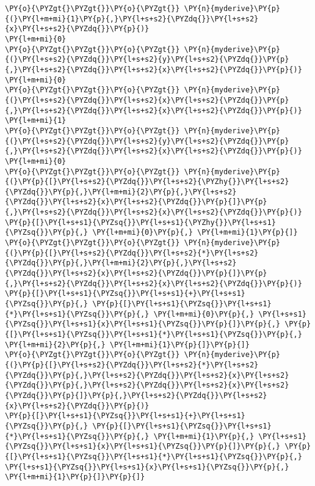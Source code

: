 \begin{Verbatim}[commandchars=\\\{\}]
\PY{o}{\PYZgt{}\PYZgt{}}\PY{o}{\PYZgt{}} \PY{n}{myderive}\PY{p}{(}\PY{l+m+mi}{1}\PY{p}{,}\PY{l+s+s2}{\PYZdq{}}\PY{l+s+s2}{x}\PY{l+s+s2}{\PYZdq{}}\PY{p}{)}
\PY{l+m+mi}{0}
\PY{o}{\PYZgt{}\PYZgt{}}\PY{o}{\PYZgt{}} \PY{n}{myderive}\PY{p}{(}\PY{l+s+s2}{\PYZdq{}}\PY{l+s+s2}{y}\PY{l+s+s2}{\PYZdq{}}\PY{p}{,}\PY{l+s+s2}{\PYZdq{}}\PY{l+s+s2}{x}\PY{l+s+s2}{\PYZdq{}}\PY{p}{)}
\PY{l+m+mi}{0}
\PY{o}{\PYZgt{}\PYZgt{}}\PY{o}{\PYZgt{}} \PY{n}{myderive}\PY{p}{(}\PY{l+s+s2}{\PYZdq{}}\PY{l+s+s2}{x}\PY{l+s+s2}{\PYZdq{}}\PY{p}{,}\PY{l+s+s2}{\PYZdq{}}\PY{l+s+s2}{x}\PY{l+s+s2}{\PYZdq{}}\PY{p}{)}
\PY{l+m+mi}{1}
\PY{o}{\PYZgt{}\PYZgt{}}\PY{o}{\PYZgt{}} \PY{n}{myderive}\PY{p}{(}\PY{l+s+s2}{\PYZdq{}}\PY{l+s+s2}{y}\PY{l+s+s2}{\PYZdq{}}\PY{p}{,}\PY{l+s+s2}{\PYZdq{}}\PY{l+s+s2}{x}\PY{l+s+s2}{\PYZdq{}}\PY{p}{)}
\PY{l+m+mi}{0}
\PY{o}{\PYZgt{}\PYZgt{}}\PY{o}{\PYZgt{}} \PY{n}{myderive}\PY{p}{(}\PY{p}{[}\PY{l+s+s2}{\PYZdq{}}\PY{l+s+s2}{\PYZhy{}}\PY{l+s+s2}{\PYZdq{}}\PY{p}{,}\PY{l+m+mi}{2}\PY{p}{,}\PY{l+s+s2}{\PYZdq{}}\PY{l+s+s2}{x}\PY{l+s+s2}{\PYZdq{}}\PY{p}{]}\PY{p}{,}\PY{l+s+s2}{\PYZdq{}}\PY{l+s+s2}{x}\PY{l+s+s2}{\PYZdq{}}\PY{p}{)}
\PY{p}{[}\PY{l+s+s1}{\PYZsq{}}\PY{l+s+s1}{\PYZhy{}}\PY{l+s+s1}{\PYZsq{}}\PY{p}{,} \PY{l+m+mi}{0}\PY{p}{,} \PY{l+m+mi}{1}\PY{p}{]}
\PY{o}{\PYZgt{}\PYZgt{}}\PY{o}{\PYZgt{}} \PY{n}{myderive}\PY{p}{(}\PY{p}{[}\PY{l+s+s2}{\PYZdq{}}\PY{l+s+s2}{*}\PY{l+s+s2}{\PYZdq{}}\PY{p}{,}\PY{l+m+mi}{2}\PY{p}{,}\PY{l+s+s2}{\PYZdq{}}\PY{l+s+s2}{x}\PY{l+s+s2}{\PYZdq{}}\PY{p}{]}\PY{p}{,}\PY{l+s+s2}{\PYZdq{}}\PY{l+s+s2}{x}\PY{l+s+s2}{\PYZdq{}}\PY{p}{)}
\PY{p}{[}\PY{l+s+s1}{\PYZsq{}}\PY{l+s+s1}{+}\PY{l+s+s1}{\PYZsq{}}\PY{p}{,} \PY{p}{[}\PY{l+s+s1}{\PYZsq{}}\PY{l+s+s1}{*}\PY{l+s+s1}{\PYZsq{}}\PY{p}{,} \PY{l+m+mi}{0}\PY{p}{,} \PY{l+s+s1}{\PYZsq{}}\PY{l+s+s1}{x}\PY{l+s+s1}{\PYZsq{}}\PY{p}{]}\PY{p}{,} \PY{p}{[}\PY{l+s+s1}{\PYZsq{}}\PY{l+s+s1}{*}\PY{l+s+s1}{\PYZsq{}}\PY{p}{,} \PY{l+m+mi}{2}\PY{p}{,} \PY{l+m+mi}{1}\PY{p}{]}\PY{p}{]}
\PY{o}{\PYZgt{}\PYZgt{}}\PY{o}{\PYZgt{}} \PY{n}{myderive}\PY{p}{(}\PY{p}{[}\PY{l+s+s2}{\PYZdq{}}\PY{l+s+s2}{*}\PY{l+s+s2}{\PYZdq{}}\PY{p}{,}\PY{l+s+s2}{\PYZdq{}}\PY{l+s+s2}{x}\PY{l+s+s2}{\PYZdq{}}\PY{p}{,}\PY{l+s+s2}{\PYZdq{}}\PY{l+s+s2}{x}\PY{l+s+s2}{\PYZdq{}}\PY{p}{]}\PY{p}{,}\PY{l+s+s2}{\PYZdq{}}\PY{l+s+s2}{x}\PY{l+s+s2}{\PYZdq{}}\PY{p}{)}
\PY{p}{[}\PY{l+s+s1}{\PYZsq{}}\PY{l+s+s1}{+}\PY{l+s+s1}{\PYZsq{}}\PY{p}{,} \PY{p}{[}\PY{l+s+s1}{\PYZsq{}}\PY{l+s+s1}{*}\PY{l+s+s1}{\PYZsq{}}\PY{p}{,} \PY{l+m+mi}{1}\PY{p}{,} \PY{l+s+s1}{\PYZsq{}}\PY{l+s+s1}{x}\PY{l+s+s1}{\PYZsq{}}\PY{p}{]}\PY{p}{,} \PY{p}{[}\PY{l+s+s1}{\PYZsq{}}\PY{l+s+s1}{*}\PY{l+s+s1}{\PYZsq{}}\PY{p}{,} \PY{l+s+s1}{\PYZsq{}}\PY{l+s+s1}{x}\PY{l+s+s1}{\PYZsq{}}\PY{p}{,} \PY{l+m+mi}{1}\PY{p}{]}\PY{p}{]}

\end{Verbatim}
